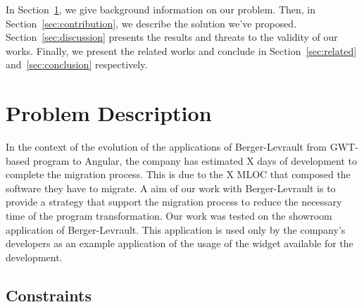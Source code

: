 \documentclass[conference]{IEEEtran}
\begin{document}
    
    In Section~\ref{sec:problem}, we give background information on our problem. 
    Then, in Section~\ref{sec:contribution}, we describe the solution we've proposed.
    Section~\ref{sec:discussion} presents the results and threats to the validity of our works.
    Finally, we present the related works and conclude in Section~\ref{sec:related} and~\ref{sec:conclusion} respectively.
    
    \section{Problem Description}
    \label{sec:problem}
    
    
    In the context of the evolution of the applications of Berger-Levrault
        from GWT-based program to Angular, the company has estimated X days of development to complete the migration process.
    This is due to the X MLOC that composed the software they have to migrate.
    A aim of our work with Berger-Levrault is to provide a strategy that support
        the migration process to reduce the necessary time of the program transformation.
    Our work was tested on the showroom application of Berger-Levrault. 
    This application is used only by the company's developers as
        an example application of the usage of the widget available for the development.
    
    
    
    \subsection{Constraints}
    \label{sec:constraints}
\end{document}
